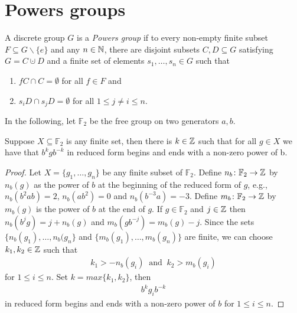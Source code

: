 \section{Powers groups}
\begin{definition}
A discrete group $G$ is a \emph{Powers group} if to every non-empty finite subset $F \subseteq G\backslash\{e\}$ and any $n \in \mathbb{N}$, there are disjoint subsets $C,D \subseteq G$ satisfying $G = C \cupdot D$ and a finite set of elements $s_1,\dots,s_n \in G$ such that
\begin{enumerate}
\item $fC \cap C = \emptyset$ for all $f \in F$ and
\item $s_i D \cap s_j D = \emptyset$ for all $1 \leq j \neq i \leq n$.
\end{enumerate}
\end{definition}

In the following, let $\mathbb{F}_2$ be the free group on two generators $a,b$. 
\begin{lemma}\label{F2 start end}
Suppose $X \subseteq \mathbb{F}_{2}$ is any finite set, then there is $k \in \mathbb{Z}$ such that for all $g \in X$ we have that $b^k g b^{-k}$ in reduced form begins and ends with a non-zero power of b.
\begin{proof}
Let $X=\{g_1,\dots,g_n\}$ be any finite subset of $\mathbb{F}_{2}$. Define $n_{b} \colon \mathbb{F}_{2} \to \mathbb{Z}$ by $n_{b}(g)$ as the power of $b$ at the beginning of the reduced form of $g$, e.g., $n_{b}(b^2 a b)=2$, $n_{b}(ab^2)=0$ and $n_{b}(b^{-3}a)=-3$. Define $m_{b} \colon \mathbb{F}_{2} \to \mathbb{Z}$ by $m_{b}(g)$ is the power of $b$ at the end of $g$. If $g \in \mathbb{F}_{2}$ and $j \in \mathbb{Z}$ then $n_{b}(b^j g)=j+n_{b}(g)$ and $m_{b}(g b^{-j})=m_{b}(g)-j$. Since the sets $\{n_{b}(g_1),\dots,n_{b}(g_{n}\}$ and $\{m_{b}(g_1),\dots,m_{b}(g_n)\}$ are finite, we can choose $k_{1}, k_{2} \in \mathbb{Z}$ such that
\begin{align*}
k_{1} > -n_{b}(g_{i}) \ \text{ and } \ k_{2} > m_{b}(g_{i})
\end{align*}
for $1 \leq i \leq n$. Set $k=max\{k_{1},k_{2}\}$, then
\begin{align*}
b^kg_{i}b^{-k}
\end{align*}
in reduced form begins and ends with a non-zero power of $b$ for $1 \leq i \leq n$.
\end{proof}
\end{lemma}

